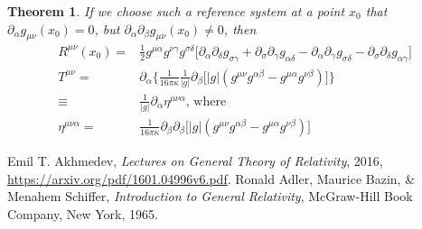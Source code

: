 \documentclass[]{article}
\newtheorem{theorem}{Theorem}
\begin{document}
\begin{theorem}
	If we choose such a reference system at a point $x_0$ that $\partial_{\alpha}g_{\mu\nu}(x_0)=0$, but $\partial_{\alpha}\partial_{\beta}g_{\mu\nu}(x_0)\neq0$, then
	\begin{align*}
	R^{\mu\nu}(x_0) = & \frac{1}{2}g^{\mu\alpha}g^{\nu\gamma}g^{\sigma\delta}\big[\partial_{\alpha}\partial_{\delta}g_{\sigma\gamma} + \partial_{\sigma}\partial_{\gamma}g_{\alpha\delta} - \partial_{\alpha}\partial_{\gamma}g_{\sigma\delta} - \partial_{\sigma}\partial_{\delta}g_{\alpha\gamma}\big]\\
	T^{\mu\nu} =& \partial_{\alpha}\bigg\{ \frac{1}{16\pi\kappa}\frac{1}{|g|}\partial_{\beta}\big[|g|(g^{\mu\nu}g^{\alpha\beta}-g^{\mu\alpha}g^{\nu\beta})\big]\bigg\}\\
	\equiv& \frac{1}{|g|}\partial_{\alpha}\eta^{\mu\nu\alpha} \text{, where}\\
	\eta^{\mu\nu\alpha} =& \frac{1}{16\pi\kappa} \partial_{\beta} \partial_{\beta}\big[|g|(g^{\mu\nu}g^{\alpha\beta}-g^{\mu\alpha}g^{\nu\beta})\big]
	\end{align*}
\end{theorem}



\begin{thebibliography}{9}
	
	Emil T. Akhmedev,
	\emph{Lectures on General Theory of Relativity},
	2016,
	\url{https://arxiv.org/pdf/1601.04996v6.pdf}.
	Ronald Adler, Maurice Bazin, \& Menahem Schiffer,
	\emph{Introduction to General Relativity},
	McGraw-Hill Book Company, New York,
	1965.
	
	
\end{thebibliography}
\end{document}
